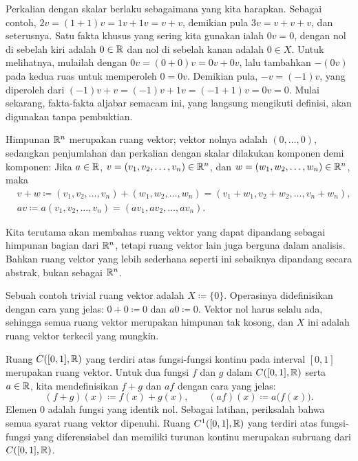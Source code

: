 Perkalian dengan skalar berlaku sebagaimana yang kita harapkan.
Sebagai contoh, $2v = (1+1)v = 1v + 1v = v+v$, demikian pula $3v = v+v+v$, dan
seterusnya.
Satu fakta khusus yang sering kita gunakan ialah $0 v = 0$, dengan
nol di sebelah kiri adalah $0 \in {\mathbb{R}}$ dan nol di sebelah kanan adalah $0 \in X$.
Untuk melihatnya, mulailah dengan
$0v = (0+0)v = 0v + 0v$, lalu tambahkan $-(0v)$ pada kedua ruas
untuk memperoleh $0 = 0v$.  Demikian pula, $-v = (-1)v$, yang diperoleh dari
$(-1)v+v = (-1)v + 1v = (-1+1)v = 0v = 0$.
Mulai sekarang, fakta-fakta aljabar semacam ini, yang langsung mengikuti
definisi, akan digunakan tanpa pembuktian.

\begin{example}
Himpunan ${\mathbb{R}}^n$ merupakan ruang vektor;
vektor nolnya adalah $(0,\ldots,0)$, sedangkan penjumlahan
dan perkalian dengan skalar dilakukan komponen demi komponen:
Jika $a \in {\mathbb{R}}$, $v = (v_1,v_2,\ldots,v_n) \in {\mathbb{R}}^n$, dan $w =
(w_1,w_2,\ldots,w_n) \in {\mathbb{R}}^n$, maka
\begin{align*}
& v+w \coloneqq
(v_1,v_2,\ldots,v_n) +
(w_1,w_2,\ldots,w_n) 
=
(v_1+w_1,v_2+w_2,\ldots,v_n+w_n) , \\
& a v \coloneqq
a (v_1,v_2,\ldots,v_n) =
(a v_1, a v_2,\ldots, a v_n) .
\end{align*}
\end{example}

Kita terutama akan membahas ruang vektor  yang dapat
dipandang sebagai himpunan bagian dari ${\mathbb{R}}^n$, tetapi ruang vektor lain juga berguna dalam
analisis.
Bahkan ruang vektor yang lebih sederhana seperti ini sebaiknya dipandang
secara abstrak, bukan sebagai ${\mathbb{R}}^n$.

\begin{example}
Sebuah contoh trivial ruang vektor adalah
$X \coloneqq \{ 0 \}$.  Operasinya didefinisikan dengan cara yang jelas:
$0 + 0 \coloneqq 0$ dan $a0 \coloneqq 0$.  Vektor nol harus selalu ada,
sehingga semua ruang vektor merupakan himpunan tak kosong, dan $X$ ini adalah ruang
vektor terkecil yang mungkin.
\end{example}

\begin{example}
Ruang $C([0,1],{\mathbb{R}})$ yang terdiri atas fungsi-fungsi kontinu pada interval $[0,1]$
merupakan ruang vektor.  Untuk dua fungsi $f$ dan $g$ dalam $C([0,1],{\mathbb{R}})$ serta
$a \in {\mathbb{R}}$, kita mendefinisikan $f+g$ dan $af$ dengan cara yang jelas:
\begin{equation*}
(f+g)(x) \coloneqq f(x) + g(x), \qquad (af) (x) \coloneqq a\bigl(f(x)\bigr) .
\end{equation*}
Elemen 0 adalah fungsi yang identik nol.  Sebagai latihan, periksalah
bahwa semua syarat ruang vektor dipenuhi.
Ruang $C^1([0,1],{\mathbb{R}})$ yang terdiri atas fungsi-fungsi yang diferensiabel dan memiliki turunan kontinu merupakan
subruang dari $C([0,1],{\mathbb{R}})$.
\end{example}

